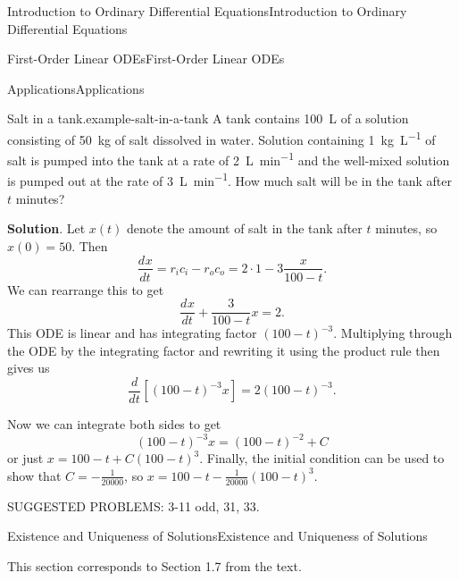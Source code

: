 \documentclass[10pt,]{book}
\numberwithin{equation}{section}
\newcommand{\dv}[3][]{\dfrac{d^{#1} #2}{d #3^{#1}}}
\begin{document}
\begin{chapterptx}{Introduction to Ordinary Differential Equations}{}{Introduction to Ordinary Differential Equations}{}{}
\begin{sectionptx}{First-Order Linear ODEs}{}{First-Order Linear ODEs}{}{}
\begin{subsectionptx}{Applications}{}{Applications}{}{}
\begin{example}{Salt in a tank.}{example-salt-in-a-tank}
\hypertarget{p-87}{}%
A tank contains \SI{100}{\liter} of a solution consisting of \SI{50}{\kilo\gram} of salt dissolved in water. Solution containing \SI{1}{\kilo\gram\per\liter} of salt is pumped into the tank at a rate of \SI{2}{\liter\per\minute} and the well-mixed solution is pumped out at the rate of \SI{3}{\liter\per\minute}. How much salt will be in the tank after \(t\) minutes?%
\par\smallskip%
\noindent\textbf{Solution}.\hypertarget{solution-15}{}\quad%
\hypertarget{p-88}{}%
Let \(x(t)\) denote the amount of salt in the tank after \(t\) minutes, so \(x(0) = 50\). Then%
\begin{equation*}
\dv{x}{t} = r_{i}c_{i}-r_{o}c_{o} = 2\cdot1-3\frac{x}{100-t}.
\end{equation*}
We can rearrange this to get%
\begin{equation*}
\dv{x}{t} + \frac{3}{100-t}x = 2.
\end{equation*}
This ODE is linear and has integrating factor \((100-t)^{-3}\). Multiplying through the ODE by the integrating factor and rewriting it using the product rule then gives us%
\begin{equation*}
\dv{}{t}[(100-t)^{-3}x] = 2(100-t)^{-3}.
\end{equation*}
%
\par
\hypertarget{p-89}{}%
Now we can integrate both sides to get%
\begin{equation*}
(100-t)^{-3}x = (100-t)^{-2}+C
\end{equation*}
or just \(x = 100-t+C(100-t)^{3}\). Finally, the initial condition can be used to show that \(C = -\frac{1}{20000}\), so \(x = 100-t - \frac{1}{20000}(100-t)^{3}\).%
\end{example}
\end{subsectionptx}
\begin{conclusion}{}%
\hypertarget{p-90}{}%
SUGGESTED PROBLEMS: 3-11 odd, 31, 33.%
\end{conclusion}%
\end{sectionptx}
%
%
\typeout{************************************************}
\typeout{************************************************}
%
\begin{sectionptx}{Existence and Uniqueness of Solutions}{}{Existence and Uniqueness of Solutions}{}{}\label{section-existence-and-uniqueness-of-solutions}
\begin{introduction}{}%
\hypertarget{p-91}{}%
This section corresponds to Section 1.7 from the text.%

\end{introduction}
\end{sectionptx}
\end{chapterptx}
\end{document}

